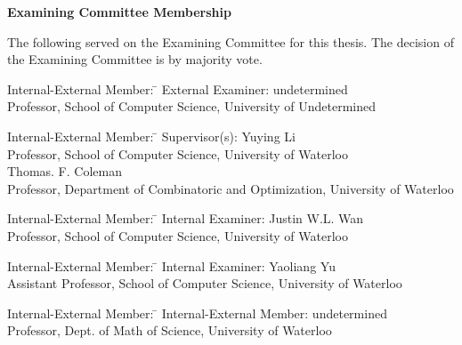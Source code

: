 \cleardoublepage %


\begin{center}\textbf{Examining Committee Membership}\end{center}
  \noindent
The following served on the Examining Committee for this thesis. The decision of the Examining Committee is by majority vote.
  \bigskip

  \noindent
\begin{tabbing}
Internal-External Member: \=  \kill %
External Examiner: \>  undetermined \\
\> Professor, School of Computer Science, University of Undetermined \\
\end{tabbing}
  \bigskip

  \noindent
\begin{tabbing}
Internal-External Member: \=  \kill %
Supervisor(s): \> Yuying Li \\
\> Professor, School of Computer Science, University of Waterloo \\
\> Thomas. F. Coleman \\
\> Professor, Department of Combinatoric and Optimization, University of Waterloo \\
\end{tabbing}
  \bigskip

  \noindent
  \begin{tabbing}
Internal-External Member: \=  \kill %
Internal Examiner: \>  Justin W.L. Wan \\
\> Professor, School of Computer Science, University of Waterloo \\
\end{tabbing}
  \bigskip


  \begin{tabbing}
Internal-External Member: \=  \kill %
Internal Examiner: \>  Yaoliang Yu \\
\> Assistant Professor, School of Computer Science, University of Waterloo \\
\end{tabbing}
  \bigskip
  \noindent
\begin{tabbing}
Internal-External Member: \=  \kill %
Internal-External Member: \> undetermined \\
\> Professor, Dept. of Math of Science, University of Waterloo \\
\end{tabbing}
  \bigskip


